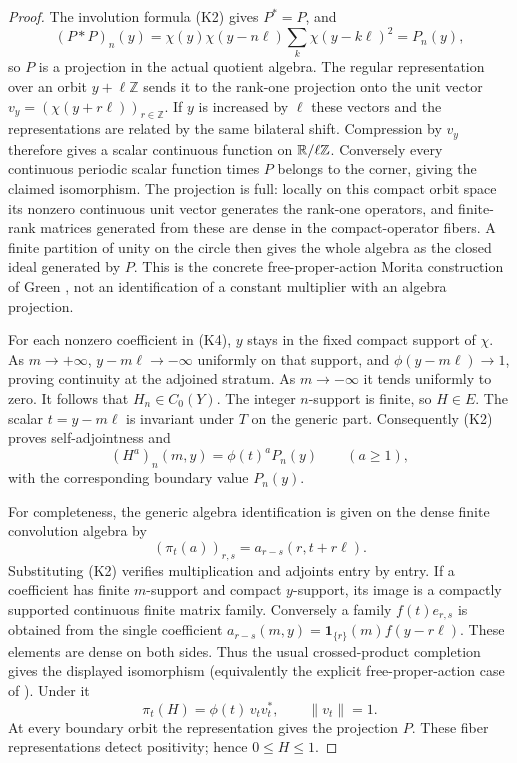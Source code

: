 \documentclass[11pt]{article}
\begin{document}
\begin{proof}
The involution formula (K2) gives $P^*=P$, and
\[
 (P*P)_n(y)=\chi(y)\chi(y-n\ell)
                 \sum_k\chi(y-k\ell)^2=P_n(y),
\]
so $P$ is a projection in the actual quotient algebra. The regular
representation over an orbit $y+\ell\mathbb Z$ sends it to the
rank-one projection onto the unit vector
$v_y=(\chi(y+r\ell))_{r\in\mathbb Z}$. If $y$ is increased by
$\ell$ these vectors and the representations are related by the
same bilateral shift. Compression by $v_y$ therefore gives a scalar
continuous function on $\mathbb R/\ell\mathbb Z$. Conversely every continuous
periodic scalar function times $P$ belongs to the corner, giving the
claimed isomorphism. The projection is full: locally on this compact
orbit space its nonzero continuous unit vector generates the rank-one
operators, and finite-rank matrices generated from these are dense in
the compact-operator fibers. A finite partition of unity on the circle
then gives the whole algebra as the closed ideal generated by $P$.
This is the concrete free-proper-action Morita construction of Green
\cite{cr:Green}, not an identification of a constant multiplier with an
algebra projection.

For each nonzero coefficient in (K4), $y$ stays in the fixed compact
support of $\chi$. As $m\to+\infty$, $y-m\ell\to-\infty$ uniformly
on that support, and $\phi(y-m\ell)\to1$, proving continuity at
the adjoined stratum. As $m\to-\infty$ it tends uniformly to zero.
It follows that $H_n\in C_0(Y)$. The integer $n$-support is finite,
so $H\in E$. The scalar $t=y-m\ell$ is invariant under $T$ on
the generic part. Consequently (K2) proves self-adjointness and
\[
 (H^a)_n(m,y)=\phi(t)^a P_n(y)\qquad(a\geq1),
\]
with the corresponding boundary value $P_n(y)$.

For completeness, the generic algebra identification is given on the
dense finite convolution algebra by
\[
 (\pi_t(a))_{r,s}=a_{r-s}(r,t+r\ell).
 \tag{K6}
\]
Substituting (K2) verifies multiplication and adjoints entry by entry.
If a coefficient has finite $m$-support and compact $y$-support,
its image is a compactly supported continuous finite matrix family.
Conversely a family $f(t)e_{r,s}$ is obtained from the single coefficient
$a_{r-s}(m,y)=\mathbf1_{\{r\}}(m)f(y-r\ell)$. These elements are dense
on both sides. Thus the usual crossed-product completion gives the
displayed isomorphism (equivalently the explicit free-proper-action
case of \cite{cr:Green}). Under it
\[
 \pi_t(H)=\phi(t)\,v_tv_t^*,\qquad \|v_t\|=1.
\]
At every boundary orbit the representation gives the projection $P$.
These fiber representations detect positivity; hence $0\leq H\leq1$.


\end{proof}
\end{document}

